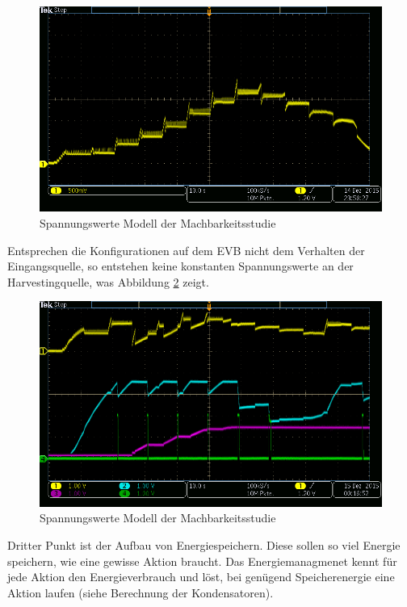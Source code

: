 \begin{figure}    
    \includegraphics[scale = 0.3]{2TheoretischeGrundlagen/imag/RegelungVHRV.png}
    \caption{Spannungswerte Modell der Machbarkeitsstudie}\label{RegelungSpannung} 
\end{figure}

Entsprechen die Konfigurationen auf dem EVB nicht dem Verhalten der Eingangsquelle, so entstehen keine konstanten Spannungswerte an der Harvestingquelle, was Abbildung \ref{falscheRegelung} zeigt.

\begin{figure}
    \includegraphics[scale = 0.3]{2TheoretischeGrundlagen/imag/falscheRegelung.png}
    \caption{Spannungswerte Modell der Machbarkeitsstudie}\label{falscheRegelung} 
\end{figure}

Dritter Punkt ist der Aufbau von Energiespeichern. Diese sollen so viel Energie speichern, wie eine gewisse Aktion braucht. Das Energiemanagmenet kennt für jede Aktion den Energieverbrauch und löst, bei genügend Speicherenergie eine Aktion laufen (siehe Berechnung der Kondensatoren).

